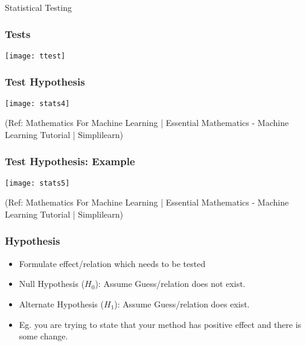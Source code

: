 \begin{frame}[fragile]\frametitle{}
\begin{center}
{\Large Statistical Testing}
\end{center}
\end{frame}

\begin{frame}[fragile]\frametitle{Tests}
\begin{center}
\texttt{[image: ttest]}
\end{center}
\end{frame}

\begin{frame}[fragile]\frametitle{Test Hypothesis}
\begin{center}
\texttt{[image: stats4]}
\end{center}

{\tiny (Ref: Mathematics For Machine Learning | Essential Mathematics - Machine Learning Tutorial | Simplilearn)}

\end{frame}



\begin{frame}[fragile]\frametitle{Test Hypothesis: Example}
\begin{center}
\texttt{[image: stats5]}
\end{center}

{\tiny (Ref: Mathematics For Machine Learning | Essential Mathematics - Machine Learning Tutorial | Simplilearn)}

\end{frame}

\begin{frame}[fragile]\frametitle{Hypothesis}
\begin{itemize}
\item Formulate effect/relation which needs to be tested
\item Null Hypothesis ($H_0$): Assume Guess/relation does not exist.
\item Alternate Hypothesis ($H_1$): Assume Guess/relation does exist. 
\item Eg. you are trying to state that your method has positive effect and there is some change.
\end{itemize}
\end{frame}

